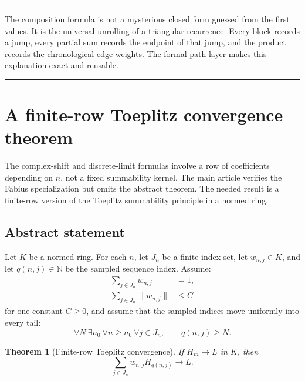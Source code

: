 \documentclass[11pt,oneside]{article}
\newtheorem{theorem}{Theorem}[section]
\theoremstyle{definition}
\theoremstyle{remark}
\newcommand{\N}{\mathbb N}
\newenvironment{boxedremark}{%
  \par\smallskip\noindent\begin{center}\begin{minipage}{0.94\textwidth}%
  \color{black}\hrule\vspace{0.6em}\small
}{%
  \vspace{0.6em}\hrule\end{minipage}\end{center}\smallskip
}
\begin{document}
\begin{boxedremark}
The composition formula is not a mysterious closed form guessed from the first values.  It
is the universal unrolling of a triangular recurrence.  Every block records a jump, every
partial sum records the endpoint of that jump, and the product records the chronological
edge weights.  The formal path layer makes this explanation exact and reusable.
\end{boxedremark}

\section{A finite-row Toeplitz convergence theorem}
\label{sec:toeplitz}

The complex-shift and discrete-limit formulas involve a row of coefficients depending on
$n$, not a fixed summability kernel.  The main article verifies the Fabius specialization but
omits the abstract theorem.  The needed result is a finite-row version of the Toeplitz
summability principle in a normed ring.

\subsection{Abstract statement}

Let $K$ be a normed ring.  For each $n$, let $J_n$ be a finite index set, let
$w_{n,j}\in K$, and let $q(n,j)\in\N$ be the sampled sequence index.  Assume:
\begin{align}
 \sum_{j\in J_n}w_{n,j}&=1,                                \label{eq:toeplitz-row-mass}\\
 \sum_{j\in J_n}\|w_{n,j}\|&\le C                         \label{eq:toeplitz-variation}
\end{align}
for one constant $C\ge0$, and assume that the sampled indices move uniformly into every
tail:
\begin{equation}
 \forall N\ \exists n_0\ \forall n\ge n_0\ \forall j\in J_n,
 \qquad q(n,j)\ge N.
 \label{eq:toeplitz-tail-index}
\end{equation}

\begin{theorem}[Finite-row Toeplitz convergence]
\label{thm:finite-row-toeplitz}
If $H_m\to L$ in $K$, then
\begin{equation}
 \sum_{j\in J_n}w_{n,j}H_{q(n,j)}\longrightarrow L.
 \label{eq:finite-row-toeplitz}
\end{equation}
\end{theorem}
\end{document}
